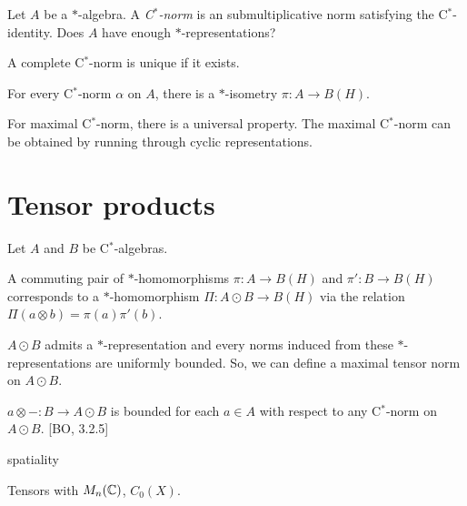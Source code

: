 \documentclass{../../large}
\begin{document}
\begin{prb}[Ideals]
\end{prb}


\begin{prb}
Let $A$ be a $*$-algebra.
A \emph{C$^*$-norm} is an submultiplicative norm satisfying the C$^*$-identity.
Does $A$ have enough $*$-representations?
\begin{parts}
\item A complete C$^*$-norm is unique if it exists.
\item For every C$^*$-norm $\alpha$ on $A$, there is a $*$-isometry $\pi:A\to B(H)$.
\item For maximal C$^*$-norm, there is a universal property. The maximal C$^*$-norm can be obtained by running through cyclic representations.
\end{parts}
\end{prb}


\section{Tensor products}

\begin{prb}
Let $A$ and $B$ be C$^*$-algebras.
\begin{parts}
\item A commuting pair of $*$-homomorphisms $\pi:A\to B(H)$ and $\pi':B\to B(H)$ corresponds to a $*$-homomorphism $\Pi:A\odot B\to B(H)$ via the relation $\Pi(a\otimes b)=\pi(a)\pi'(b)$.
\item $A\odot B$ admits a $*$-representation and every norms induced from these $*$-representations are uniformly bounded. So, we can define a maximal tensor norm on $A\odot B$.
\item $a\otimes-:B\to A\odot B$ is bounded for each $a\in A$ with respect to any C$^*$-norm on $A\odot B$. [BO, 3.2.5]
\end{parts}
\end{prb}


\begin{prb}
spatiality
\end{prb}
\begin{prb}
\end{prb}

Tensors with $M_n(\mathbb{C})$, $C_0(X)$.


\begin{prb}
\end{prb}
\end{document}
